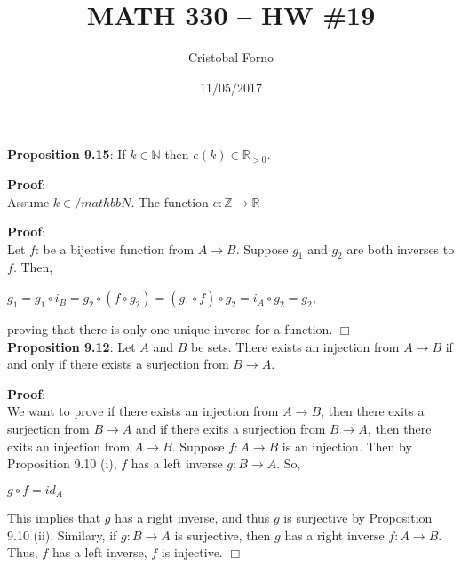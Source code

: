 \documentclass[12pt]{article}
\title{MATH 330 -- HW \#19}
\author{Cristobal Forno}
\date{11/05/2017}
\begin{document}
\maketitle

\noindent
\textbf{Proposition 9.15}: If $k \in \mathbb{N}$ then $e(k) \in
\mathbb{R}_{>0}$.

\noindent
\textbf{Proof}:\\
Assume $k \in /mathbb{N}$. The function $e: \mathbb{Z} \to \mathbb{R}$ 

\noindent
\textbf{Proof}:\\
Let $f$: be a bijective function from  $A \to B$.
Suppose $g_1$ and $g_2$ are both inverses to $f$. Then,
\begin{center}
$ g_1 = g_1 \circ i_B = g_2 \circ (f \circ g_2) = (g_1 \circ f) \circ
g_2 = i_A \circ g_2 = g_2 $,
\end{center}
\noindent
proving that there is only one unique inverse for a function. $\Box$ \\

\noindent
\textbf{Proposition 9.12}: Let $A$ and $B$ be sets. There exists an injection
from $A \to B$ if and only if there exists a surjection from $B \to A$.

\noindent
\textbf{Proof}:\\
We want to prove if there exists an injection from $A \to B$, then there exits a
surjection from $B \to A$ and if there exits a surjection from $B \to A$,
then there exits an injection from $A \to B$. Suppose $f:A \to B$ is an
injection. Then by Proposition 9.10 (i), $f$ has a left inverse $g: B \to A$. So,
\begin{center}
$g \circ f = id_A$
\end{center}
This implies that $g$ has a right inverse, and thus $g$ is surjective by
Proposition 9.10 (ii). Similary, if $g: B \to A$ is surjective, then $g$ has a
right inverse $f: A \to B$. Thus, $f$ has a left inverse, $f$ is injective. $\Box$
\end{document}
